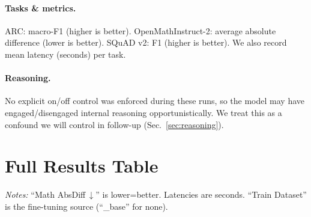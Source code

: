 \documentclass[11pt,a4paper]{article}
\begin{document}
\paragraph{Tasks \& metrics.} 
ARC: macro-F1 (higher is better). 
OpenMathInstruct-2: average absolute difference (lower is better). 
SQuAD v2: F1 (higher is better). 
We also record mean latency (seconds) per task.

\paragraph{Reasoning.} No explicit on/off control was enforced during these runs, so the model may have engaged/disengaged internal reasoning opportunistically. We treat this as a confound we will control in follow-up (Sec.~\ref{sec:reasoning}).

\section{Full Results Table}
\label{sec:fulltable}

\noindent\textit{Notes:} ``Math AbsDiff\,$\downarrow$'' is lower=better. Latencies are seconds. ``Train Dataset'' is the fine-tuning source (``\_base'' for none).
\end{document}
